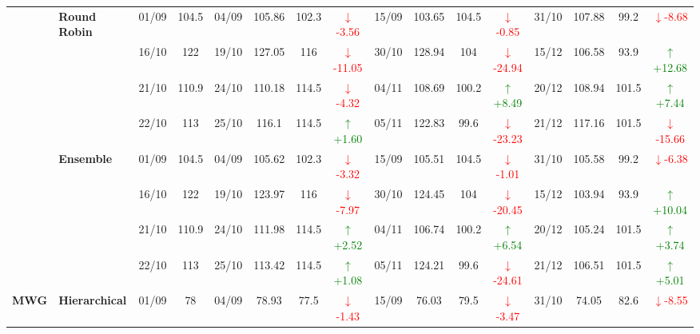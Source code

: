 {\begin{longtable}{llcc|cccc|cccc|cccc}
& \textbf{Round Robin}
& 01/09 & 104.5 & 04/09 & 105.86 & 102.3 & \textcolor{red}{\(\downarrow\)-3.56} & 15/09 & 103.65 & 104.5 & \textcolor{red}{\(\downarrow\)-0.85} & 31/10 & 107.88 & 99.2 & \textcolor{red}{\(\downarrow\)-8.68} \\

&
& 16/10 & 122 & 19/10 & 127.05 & 116 & \textcolor{red}{\(\downarrow\)-11.05} & 30/10 & 128.94 & 104 & \textcolor{red}{\(\downarrow\)-24.94} & 15/12 & 106.58 & 93.9 & \textcolor{green}{\(\uparrow\)+12.68} \\

&
& 21/10 & 110.9 & 24/10 & 110.18 & 114.5 & \textcolor{red}{\(\downarrow\)-4.32} & 04/11 & 108.69 & 100.2 & \textcolor{green}{\(\uparrow\)+8.49} & 20/12 & 108.94 & 101.5 & \textcolor{green}{\(\uparrow\)+7.44} \\

&
& 22/10 & 113 & 25/10 & 116.1 & 114.5 & \textcolor{green}{\(\uparrow\)+1.60} & 05/11 & 122.83 & 99.6 & \textcolor{red}{\(\downarrow\)-23.23} & 21/12 & 117.16 & 101.5 & \textcolor{red}{\(\downarrow\)-15.66} \\
\cmidrule(lr){2-16}


& \textbf{Ensemble}
& 01/09 & 104.5 & 04/09 & 105.62 & 102.3 & \textcolor{red}{\(\downarrow\)-3.32} & 15/09 & 105.51 & 104.5 & \textcolor{red}{\(\downarrow\)-1.01} & 31/10 & 105.58 & 99.2 & \textcolor{red}{\(\downarrow\)-6.38} \\

&
& 16/10 & 122 & 19/10 & 123.97 & 116 & \textcolor{red}{\(\downarrow\)-7.97} & 30/10 & 124.45 & 104 & \textcolor{red}{\(\downarrow\)-20.45} & 15/12 & 103.94 & 93.9 & \textcolor{green}{\(\uparrow\)+10.04} \\

&
& 21/10 & 110.9 & 24/10 & 111.98 & 114.5 & \textcolor{green}{\(\uparrow\)+2.52} & 04/11 & 106.74 & 100.2 & \textcolor{green}{\(\uparrow\)+6.54} & 20/12 & 105.24 & 101.5 & \textcolor{green}{\(\uparrow\)+3.74} \\

&
& 22/10 & 113 & 25/10 & 113.42 & 114.5 & \textcolor{green}{\(\uparrow\)+1.08} & 05/11 & 124.21 & 99.6 & \textcolor{red}{\(\downarrow\)-24.61} & 21/12 & 106.51 & 101.5 & \textcolor{green}{\(\uparrow\)+5.01} \\
\midrule




\multirow{12}{*}{\textbf{MWG}} 
& \textbf{Hierarchical}
& 01/09 & 78 & 04/09 & 78.93 & 77.5 & \textcolor{red}{\(\downarrow\)-1.43} & 15/09 & 76.03 & 79.5 & \textcolor{red}{\(\downarrow\)-3.47} & 31/10 & 74.05 & 82.6 & \textcolor{red}{\(\downarrow\)-8.55} \\


\end{longtable}}
